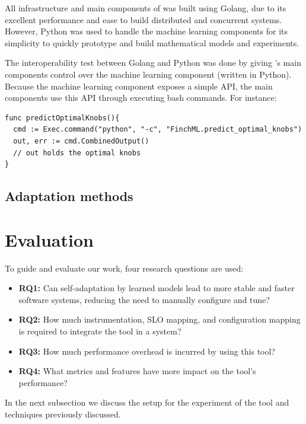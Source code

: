 All infrastructure and main components of \projectname{} was built using Golang, due to its excellent performance and ease to build distributed and concurrent systems. However, Python was used to handle the machine learning components for its simplicity to quickly prototype and build mathematical models and experiments.

The interoperability test between Golang and Python was done by giving \projectname{}'s main components control over the machine learning component (written in Python). Because the machine learning component exposes a simple API, the main components use this API through executing bash commands. For instance:

\begin{lstlisting}
func predictOptimalKnobs(){
  cmd := Exec.command("python", "-c", "FinchML.predict_optimal_knobs")
  out, err := cmd.CombinedOutput()
  // out holds the optimal knobs
}
\end{lstlisting}


\subsection{Adaptation methods}


\section{Evaluation}

To guide and evaluate our work, four research questions are used:

\begin{itemize}
  \item \textbf{RQ1:} Can self-adaptation by learned models lead to more stable and faster software systems, reducing the need to manually configure and tune?
  \item \textbf{RQ2:} How much instrumentation, SLO mapping, and configuration mapping is required to integrate the tool in a system?
  \item \textbf{RQ3:} How much performance overhead is incurred by using this tool?
  \item \textbf{RQ4:} What metrics and features have more impact on the tool's performance?
\end{itemize}

In the next subsection we discuss the setup for the experiment of the tool and techniques previously discussed.

